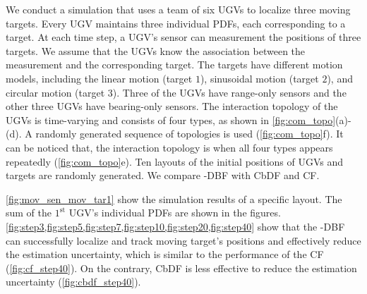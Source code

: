 	We conduct a simulation that uses a team of six UGVs to localize three moving targets.
	Every UGV maintains three individual PDFs, each corresponding to a target.
	At each time step, a UGV's sensor can measurement the positions of three targets.
	We assume that the UGVs know the association between the measurement and the corresponding target.
	The targets have different motion models, including the linear motion (target $1$), sinusoidal motion (target $2$), and circular motion (target $3$).
	Three of the UGVs have range-only sensors and the other three UGVs have bearing-only sensors.
	The interaction topology of the UGVs is time-varying and consists of four types, as shown in \cref{fig:com_topo}(a)-(d).
	A randomly generated sequence of topologies is used (\cref{fig:com_topo}f).
	It can be noticed that, the interaction topology is \fc when all four types appears repeatedly (\cref{fig:com_topo}e).
	Ten layouts of the initial positions of UGVs and targets are randomly generated.
	We compare \proto-DBF with CbDF and CF.
	
	\cref{fig:mov_sen_mov_tar1} show the simulation results of a specific layout.
	The sum of the $1^\text{st}$ UGV's individual PDFs are shown in the figures.
	\cref{fig:step3,fig:step5,fig:step7,fig:step10,fig:step20,fig:step40} show that the \proto-DBF can successfully localize and track moving target's positions and effectively reduce the estimation uncertainty, which is similar to the performance of the CF (\cref{fig:cf_step40}).
	On the contrary, CbDF is less effective to reduce the estimation uncertainty (\cref{fig:cbdf_step40}).
	
